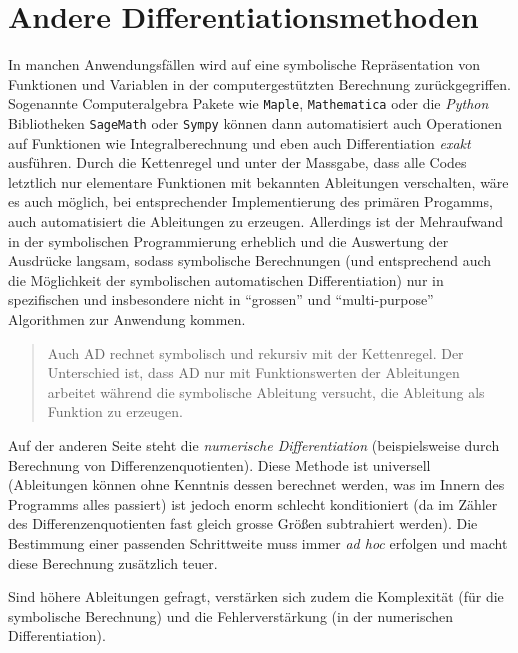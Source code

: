 \documentclass[
]{book}
\newenvironment {JHSAYS} [0] {\begin{quote}\color{jhsc}} {\end{quote}}
\theoremstyle{definition}
\theoremstyle{definition}
\theoremstyle{definition}
\theoremstyle{definition}
\theoremstyle{remark}
\begin{document}
\hypertarget{andere-differentiationsmethoden}{%
\section{Andere Differentiationsmethoden}\label{andere-differentiationsmethoden}}

In manchen Anwendungsfällen wird auf eine symbolische Repräsentation von
Funktionen und Variablen in der computergestützten Berechnung
zurückgegriffen. Sogenannte Computeralgebra Pakete wie \texttt{Maple},
\texttt{Mathematica} oder die \emph{Python} Bibliotheken \texttt{SageMath} oder \texttt{Sympy} können
dann automatisiert auch Operationen auf Funktionen wie Integralberechnung und
eben auch Differentiation \emph{exakt} ausführen. Durch die Kettenregel und
unter der Massgabe, dass alle Codes letztlich nur elementare Funktionen mit
bekannten Ableitungen verschalten, wäre es auch möglich, bei
entsprechender Implementierung des primären Progamms, auch automatisiert
die Ableitungen zu erzeugen. Allerdings ist der Mehraufwand in der symbolischen
Programmierung erheblich und die Auswertung der Ausdrücke langsam, sodass
symbolische Berechnungen (und entsprechend auch die Möglichkeit der
symbolischen automatischen Differentiation) nur in spezifischen und insbesondere
nicht in ``grossen'' und ``multi-purpose'' Algorithmen zur Anwendung kommen.

\leavevmode\hypertarget{ad-vs-sd}{}%
\begin{JHSAYS}
Auch AD rechnet symbolisch und rekursiv mit der Kettenregel. Der Unterschied ist, dass AD nur mit Funktionswerten der
Ableitungen arbeitet während die symbolische Ableitung versucht, die
Ableitung als Funktion zu erzeugen.

\end{JHSAYS}

Auf der anderen Seite steht die \emph{numerische Differentiation} (beispielsweise durch Berechnung von Differenzenquotienten).
Diese Methode ist universell (Ableitungen können ohne Kenntnis dessen
berechnet werden, was im Innern des Programms alles passiert) ist jedoch enorm schlecht konditioniert (da im
Zähler des Differenzenquotienten fast gleich grosse Größen
subtrahiert werden). Die Bestimmung einer passenden Schrittweite muss immer \emph{ad
hoc} erfolgen und macht diese Berechnung zusätzlich teuer.

Sind höhere Ableitungen gefragt, verstärken sich zudem die
Komplexität (für die symbolische Berechnung) und die Fehlerverstärkung (in der numerischen Differentiation).
\end{document}
